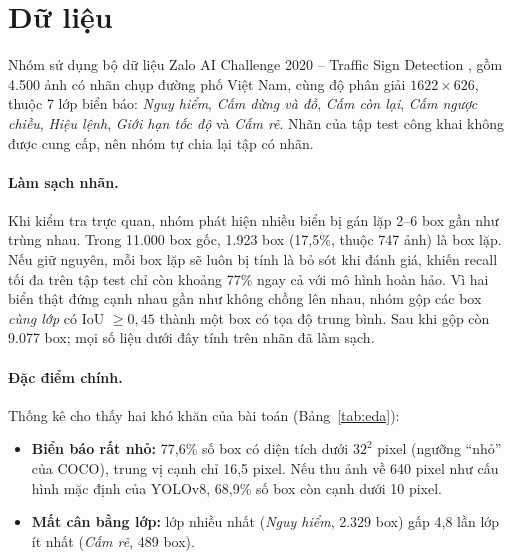 
\section{Dữ liệu}

Nhóm sử dụng bộ dữ liệu Zalo AI Challenge 2020 -- Traffic Sign Detection \citep{zalo2020}, gồm 4.500 ảnh có nhãn chụp đường phố Việt Nam, cùng độ phân giải $1622 \times 626$, thuộc 7 lớp biển báo: \textit{Nguy hiểm}, \textit{Cấm dừng và đỗ}, \textit{Cấm còn lại}, \textit{Cấm ngược chiều}, \textit{Hiệu lệnh}, \textit{Giới hạn tốc độ} và \textit{Cấm rẽ}. Nhãn của tập test công khai không được cung cấp, nên nhóm tự chia lại tập có nhãn.

\paragraph{Làm sạch nhãn.} Khi kiểm tra trực quan, nhóm phát hiện nhiều biển bị gán lặp 2--6 box gần như trùng nhau. Trong 11.000 box gốc, 1.923 box (17,5\%, thuộc 747 ảnh) là box lặp. Nếu giữ nguyên, mỗi box lặp sẽ luôn bị tính là bỏ sót khi đánh giá, khiến recall tối đa trên tập test chỉ còn khoảng 77\% ngay cả với mô hình hoàn hảo. Vì hai biển thật đứng cạnh nhau gần như không chồng lên nhau, nhóm gộp các box \textit{cùng lớp} có IoU $\geq 0{,}45$ thành một box có tọa độ trung bình. Sau khi gộp còn 9.077 box; mọi số liệu dưới đây tính trên nhãn đã làm sạch.

\paragraph{Đặc điểm chính.} Thống kê cho thấy hai khó khăn của bài toán (Bảng~\ref{tab:eda}):
\begin{itemize}
  \item \textbf{Biển báo rất nhỏ:} 77,6\% số box có diện tích dưới $32^2$ pixel (ngưỡng ``nhỏ'' của COCO), trung vị cạnh chỉ 16,5 pixel. Nếu thu ảnh về 640 pixel như cấu hình mặc định của YOLOv8, 68,9\% số box còn cạnh dưới 10 pixel.
  \item \textbf{Mất cân bằng lớp:} lớp nhiều nhất (\textit{Nguy hiểm}, 2.329 box) gấp 4,8 lần lớp ít nhất (\textit{Cấm rẽ}, 489 box).
\end{itemize}

